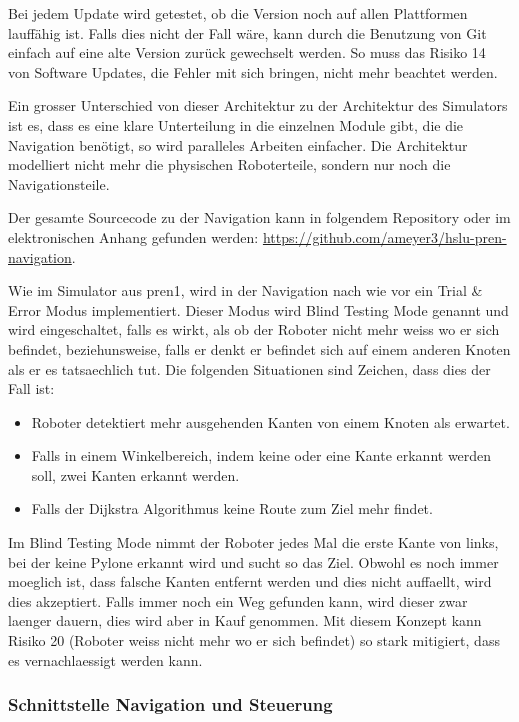Bei jedem Update wird getestet, ob die Version noch auf allen Plattformen lauffähig ist. Falls dies nicht der Fall wäre, kann durch die Benutzung von Git einfach auf eine alte Version zurück gewechselt werden. So muss das Risiko 14 von Software Updates, die Fehler mit sich bringen, nicht mehr beachtet werden.


Ein grosser Unterschied von dieser Architektur zu der Architektur des Simulators ist es, dass es eine klare Unterteilung in die einzelnen Module gibt, die die Navigation benötigt, so wird paralleles Arbeiten einfacher. Die Architektur modelliert nicht mehr die physischen Roboterteile, sondern nur noch die Navigationsteile.

Der gesamte Sourcecode zu der Navigation kann in folgendem Repository oder im elektronischen Anhang gefunden werden: \url{https://github.com/ameyer3/hslu-pren-navigation}.

Wie im Simulator aus \acrshort{pren1}, wird in der Navigation nach wie vor ein Trial \& Error Modus implementiert. Dieser Modus wird Blind Testing Mode genannt und wird eingeschaltet, falls es wirkt, als ob der Roboter nicht mehr weiss wo er sich befindet, beziehunsweise, falls er denkt er befindet sich auf einem anderen Knoten als er es tatsaechlich tut. Die folgenden Situationen sind Zeichen, dass dies der Fall ist:

\begin{itemize}
    \item Roboter detektiert mehr ausgehenden Kanten von einem Knoten als erwartet.
    \item Falls in einem Winkelbereich, indem keine oder eine Kante erkannt werden soll, zwei Kanten erkannt werden.
    \item Falls der Dijkstra Algorithmus keine Route zum Ziel mehr findet.
\end{itemize}

Im Blind Testing Mode nimmt der Roboter jedes Mal die erste Kante von links, bei der keine Pylone erkannt wird und sucht so das Ziel. Obwohl es noch immer moeglich ist, dass falsche Kanten entfernt werden und dies nicht auffaellt, wird dies akzeptiert. Falls immer noch ein Weg gefunden kann, wird dieser zwar laenger dauern, dies wird aber in Kauf genommen. Mit diesem Konzept kann Risiko 20 (Roboter weiss nicht mehr wo er sich befindet) so stark mitigiert, dass es vernachlaessigt werden kann.

\subsubsection{Schnittstelle Navigation und Steuerung}

